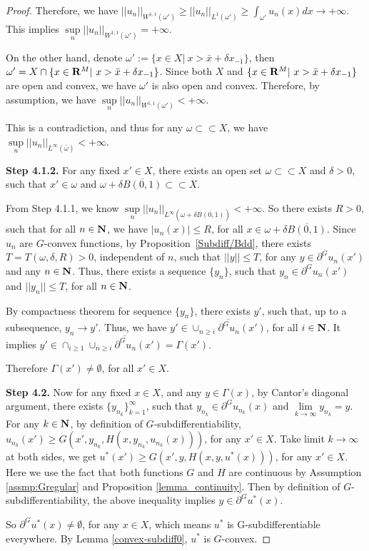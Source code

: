 \begin{proof}
	Therefore, we have $||u_n||_{W^{1,1}(\omega')} \ge ||u_n||_{L^{1}(\omega')} \ge \int_{\omega'} u_n(x) dx \rightarrow +\infty$. This implies $\sup\limits_{n} ||u_n||_{W^{1,1}(\omega')} = +\infty$.
	
	On the other hand, denote $\omega' := \{x\in X|~ x>\bar{x}+\delta x_{-1}\}$, then $\omega' = X \cap \{x\in {\mathbf R}^M|~ x> \bar{x}+\delta x_{-1} \}$. Since both $X$ and $\{x\in {\mathbf R}^M|~ x> \bar{x}+\delta x_{-1} \}$ are open and convex, we have $\omega'$ is also open and convex. Therefore, by assumption, we have $\sup\limits_{n} ||u_n||_{W^{1,1}(\omega')} < +\infty.$ 
	
	This is a contradiction, and thus for any $\omega \subset \subset X$, we have $\sup\limits_{n}||u_n||_{L^{\infty}(\bar{\omega})}<+\infty$.
	
	{\bf Step 4.1.2.} For any fixed $x'\in X$, there exists an open set $\omega \subset \subset X$ and $\delta>0$, such that $x'\in \omega$ and $\omega + \delta \overline{B(0,1)} \subset \subset X$.
	
	From Step 4.1.1, we know  $\sup\limits_{n}||u_n||_{L^{\infty}(\omega + \delta \overline{B(0,1)})} < +\infty$. 
	So there exists $R>0$, such that for all $n\in \mathbf{N}$, we have $|u_n(x)|\le R$, for all $x \in \omega + \delta \overline{B(0,1)}$. Since $u_n$ are $G$-convex functions, by Proposition~\ref{Subdiff/Bdd}, there exists $T = T(\omega, \delta, R) >0$, independent of $n$, such that $||y||\le T$, for any $y \in \partial^G u_n(x')$ and any $n\in \mathbf{N}$. Thus, there exists a sequence $\{ y_n \}$, such that $y_n \in \partial^G u_n(x')$ and $||y_n||\le T$, for all $n\in \mathbf{N}$.
	
	By compactness theorem for sequence $\{ y_n \}$,  there exists $y'$, such that, up to a subsequence, $y_n \rightarrow y'$. Thus, we have $y' \in \overline{\cup_{n\ge i}\partial^G u_n(x')}$, for all $i\in \mathbf{N}$. It implies $y' \in \cap_{i\ge 1} \overline{\cup_{n\ge i}\partial^G u_n(x')} = \Gamma (x')$. 
	
	Therefore $\Gamma(x') \neq \emptyset$, for all $x' \in X$.\medskip
	

	
	{\bf Step 4.2.} Now for any fixed $x\in X$, and any $y\in \Gamma(x)$, by Cantor's diagonal argument, there exists $\{y_{n_k}\}_{k=1}^{\infty}$, such that $y_{n_k} \in \partial^G u_{n_k}(x)$ and $\lim\limits_{k\rightarrow \infty} y_{n_k} = y$.
	For any $k\in \mathbf{N}$, by definition of $G$-subdifferentiability,
	$u_{n_k}(x')\ge G(x', y_{n_k}, H(x, y_{n_k}, u_{n_k}(x)))$, for any $x' \in X$. Take limit $k \rightarrow \infty$ at both sides, we get $u^*(x') \ge G(x', y, H(x, y, u^*(x)))$, for any $x'\in X$. Here we use the fact that both functions $G$ and
	$H$ are continuous by Assumption \ref{assmp:Gregular} and Proposition \ref{lemma_continuity}.
	Then by definition of $G$-subdifferentiability, the above inequality implies $y\in \partial ^G u^*(x)$. 
	
	So $\partial^G u^*(x)\neq \emptyset$, for any $x\in X$, which means $u^*$ is G-subdifferentiable everywhere. By Lemma \ref{convex-subdiff0}, $u^*$ is $G$-convex.
\end{proof}

